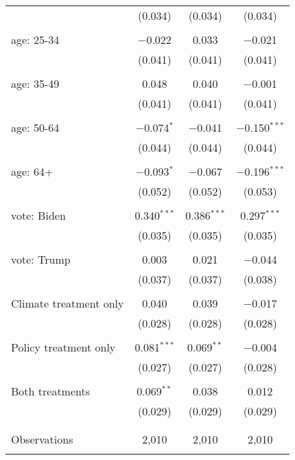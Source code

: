 \begin{tabular}{@{\extracolsep{5pt}}lccc}
  & (0.034) & (0.034) & (0.034) \\ 
  & & & \\ 
 age: 25-34 & $-$0.022 & 0.033 & $-$0.021 \\ 
  & (0.041) & (0.041) & (0.041) \\ 
  & & & \\ 
 age: 35-49 & 0.048 & 0.040 & $-$0.001 \\ 
  & (0.041) & (0.041) & (0.041) \\ 
  & & & \\ 
 age: 50-64 & $-$0.074$^{*}$ & $-$0.041 & $-$0.150$^{***}$ \\ 
  & (0.044) & (0.044) & (0.044) \\ 
  & & & \\ 
 age: 64+ & $-$0.093$^{*}$ & $-$0.067 & $-$0.196$^{***}$ \\ 
  & (0.052) & (0.052) & (0.053) \\ 
  & & & \\ 
 vote: Biden & 0.340$^{***}$ & 0.386$^{***}$ & 0.297$^{***}$ \\ 
  & (0.035) & (0.035) & (0.035) \\ 
  & & & \\ 
 vote: Trump & 0.003 & 0.021 & $-$0.044 \\ 
  & (0.037) & (0.037) & (0.038) \\ 
  & & & \\ 
 Climate treatment only & 0.040 & 0.039 & $-$0.017 \\ 
  & (0.028) & (0.028) & (0.028) \\ 
  & & & \\ 
 Policy treatment only & 0.081$^{***}$ & 0.069$^{**}$ & $-$0.004 \\ 
  & (0.027) & (0.027) & (0.028) \\ 
  & & & \\ 
 Both treatments & 0.069$^{**}$ & 0.038 & 0.012 \\ 
  & (0.029) & (0.029) & (0.029) \\ 
  & & & \\ 
\hline \\[-1.8ex] 

Observations & 2,010 & 2,010 & 2,010 \\ 
\hline 
\hline \\[-1.8ex] 
\end{tabular} 